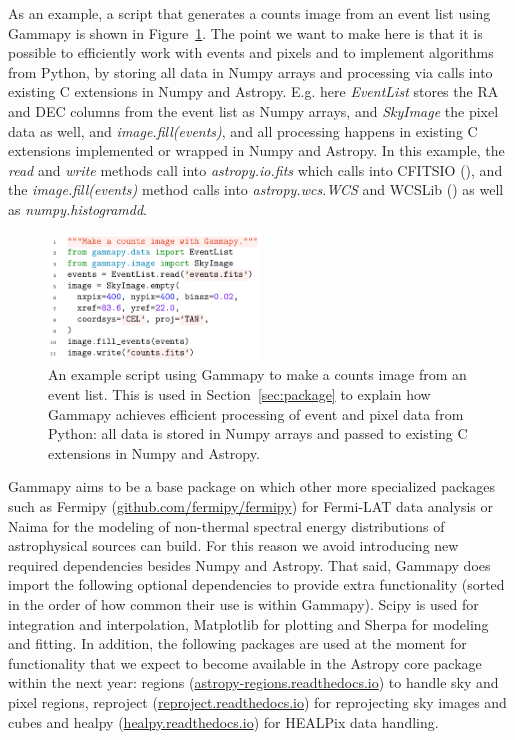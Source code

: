 \documentclass{PoS}
\newcommand{\urlCtaPipe}{\href{https://github.com/cta-observatory/ctapipe}{github.com/cta-observatory/ctapipe}}
\newcommand{\urlFermipy}{\href{https://github.com/fermipy/fermipy}{github.com/fermipy/fermipy}}
\newcommand{\urlHealpy}{\href{https://healpy.readthedocs.io}{healpy.readthedocs.io}}
\newcommand{\urlRegions}{\href{https://astropy-regions.readthedocs.io}{astropy-regions.readthedocs.io}}
\newcommand{\urlReproject}{\href{https://reproject.readthedocs.io}{reproject.readthedocs.io}}
\begin{document}
As an example, a script that generates a counts image from an event list using Gammapy
is shown in Figure~\ref{fig:code_example}. The point we want to make here is
that it is possible to efficiently work with events and pixels and to implement
algorithms from Python, by storing all data in Numpy arrays and processing via
calls into existing C extensions in Numpy and Astropy. E.g. here {\it EventList}
stores the RA and DEC columns from the event list as Numpy arrays, and {\it
SkyImage} the pixel data as well, and {\it image.fill(events)}, and all
processing happens in existing C extensions implemented or wrapped in Numpy and
Astropy. In this example, the {\it read} and {\it write} methods call into {\it
astropy.io.fits} which calls into CFITSIO (\cite{cfitsio}), and the {\it
image.fill(events)} method calls into {\it astropy.wcs.WCS} and WCSLib
(\cite{wcslib}) as well as {\it numpy.histogramdd}. 

\begin{figure}[t]
\centering
\includegraphics[width=0.5\textwidth]{examples/code_events_image}
\caption{An example script using Gammapy to make a counts image from an event list. This
is used in Section~\protect\ref{sec:package} to explain how Gammapy achieves efficient
processing of event and pixel data from Python: all data is stored in Numpy
arrays and passed to existing C extensions in Numpy and Astropy.}
\label{fig:code_example}
\end{figure}

Gammapy aims to be a base package on which other more specialized packages such
as Fermipy (\urlFermipy) for Fermi-LAT data analysis or Naima \cite{naima} for
the modeling of non-thermal spectral energy distributions of astrophysical
sources can build.
For this reason we avoid introducing new required dependencies
besides Numpy and Astropy. That said, Gammapy does import the following optional
dependencies to provide extra functionality (sorted in the order of how common
their use is within Gammapy). Scipy \cite{scipy} is used for integration and
interpolation, Matplotlib \cite{matplotlib} for plotting and Sherpa
\cite{sherpa2001, sherpa2009, sherpa2011} for modeling and fitting. In addition,
the following packages are used at the moment for functionality that we expect
to become available in the Astropy core package within the next year: regions
(\urlRegions) to handle sky and pixel regions, reproject (\urlReproject) for
reprojecting sky images and cubes and healpy (\urlHealpy) for HEALPix data
handling. 
\end{document}
